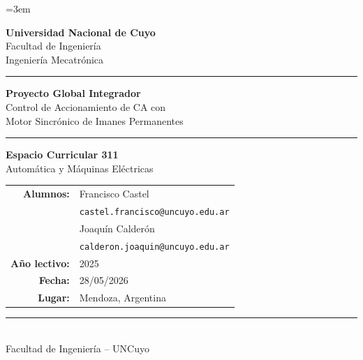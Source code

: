 \documentclass[12pt, a4paper,journal, onecolumn, compsoc]{IEEEtran}
\begin{document}
\setlength{\abovedisplayskip}{12pt plus 3pt minus 3pt}      %
\setlength{\belowdisplayskip}{12pt plus 3pt minus 3pt}      %
\setlength{\abovedisplayshortskip}{10pt plus 3pt minus 3pt} %
\setlength{\belowdisplayshortskip}{10pt plus 3pt minus 3pt} %
\hfuzz=10pt
\emergencystretch=3em

\begin{titlepage}
\thispagestyle{empty}
\centering

\vspace*{1cm}

{\large \textbf{Universidad Nacional de Cuyo}}\\[4pt]
{\large Facultad de Ingeniería}\\[4pt]
{\normalsize Ingeniería Mecatrónica}

\vspace{0.8cm}
\rule{\textwidth}{1.5pt}

\vspace{1.2cm}

{\huge \textbf{Proyecto Global Integrador}}\\[12pt]
{\LARGE Control de Accionamiento de CA con\\Motor Sincrónico de Imanes Permanentes}

\vspace{1.2cm}
\rule{\textwidth}{1.5pt}

\vspace{1.5cm}

{\large \textbf{Espacio Curricular 311}}\\[6pt]
{\Large Automática y Máquinas Eléctricas}

\vspace{2cm}

\begin{tabular}{r l}
    \textbf{Alumnos:} & Francisco Castel \\
                      & \texttt{castel.francisco@uncuyo.edu.ar} \\[8pt]
                      & Joaquín Calderón \\
                      & \texttt{calderon.joaquin@uncuyo.edu.ar} \\[12pt]
    \textbf{Año lectivo:} & 2025 \\[8pt]
    \textbf{Fecha:} & 28/05/2026 \\[8pt]
    \textbf{Lugar:} & Mendoza, Argentina \\
\end{tabular}

\vfill

\rule{0.6\textwidth}{0.4pt}\\[6pt]
{\small Facultad de Ingeniería -- UNCuyo}

\end{titlepage}
\end{document}

